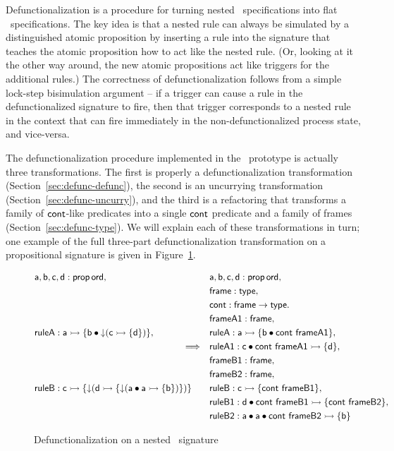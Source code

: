 Defunctionalization is a procedure for turning nested
\sls~specifications into flat \sls~specifications.  The key idea is
that a nested rule can always be simulated by a distinguished atomic
proposition by inserting a rule into the signature that teaches the
atomic proposition how to act like the nested rule. (Or, looking at it
the other way around, the new atomic propositions act like triggers
for the additional rules.)  The correctness of defunctionalization
follows from a simple lock-step bisimulation argument -- if a trigger
can cause a rule in the defunctionalized signature to fire, then that
trigger corresponds to a nested rule in the context that can fire
immediately in the non-defunctionalized process state, and vice-versa.

The defunctionalization procedure implemented in the \sls~prototype is
actually three transformations.  The first is properly a
defunctionalization transformation (Section~\ref{sec:defunc-defunc}),
the second is an uncurrying transformation
(Section~\ref{sec:defunc-uncurry}), and the third is a refactoring
that transforms a family of ${\sf cont}$-like predicates into a single
${\sf cont}$ predicate and a family of frames
(Section~\ref{sec:defunc-type}). We will explain each of these
transformations in turn; one example of the full three-part
defunctionalization transformation on a propositional signature is
given in Figure~\ref{fig:defuncexample}.

\begin{figure}[ht]
\begin{align*}
& {\sf a}, {\sf b}, {\sf c}, {\sf d} : {\sf prop}\,{\sf ord},
& & {\sf a}, {\sf b}, {\sf c}, {\sf d} : {\sf prop}\,{\sf ord},\\
& & & {\sf frame} : {\sf type}, \\
& & & {\sf cont} : {\sf frame} \rightarrow {\sf type}.\\
& & & {\sf frameA1} : {\sf frame},\\
& {\sf ruleA} : {\sf a} \rightarrowtail \{ {\sf b} \mathbin{\bullet} {\downarrow}({\sf c} \rightarrowtail \{ {\sf d} \}) \},
& & {\sf ruleA} : {\sf a} \rightarrowtail \{ {\sf b} \mathbin{\bullet} {\sf cont}~{\sf frameA1} \},
\\
& \qquad\qquad\qquad\qquad\qquad\qquad\qquad\qquad  \Longrightarrow & & {\sf ruleA1} : {\sf c} \mathbin{\bullet} {\sf cont}~{\sf frameA1} \rightarrowtail \{ {\sf d} \},\\
& & & {\sf frameB1} : {\sf frame},\\
& & & {\sf frameB2} : {\sf frame},\\
& {\sf ruleB} : {\sf c} \rightarrowtail \{ {\downarrow}({\sf d} 
       \rightarrowtail \{ {\downarrow}({\sf a} \mathbin{\bullet} {\sf a} \rightarrowtail \{ {\sf b} \}) \}) \}
& & {\sf ruleB} : {\sf c} \rightarrowtail \{ {\sf cont}~{\sf frameB1} \},
\\
& & & {\sf ruleB1} : {\sf d} \mathbin{\bullet} {\sf cont}~{\sf frameB1} 
        \rightarrowtail \{ {\sf cont}~{\sf frameB2} \},
\\
& & & {\sf ruleB2} : {\sf a} \mathbin{\bullet} {\sf a} \mathbin{\bullet} {\sf cont}~{\sf frameB2} \rightarrowtail \{ {\sf b} \}
\end{align*}
\caption{Defunctionalization on a nested \sls~signature}
\label{fig:defuncexample}
\end{figure}




